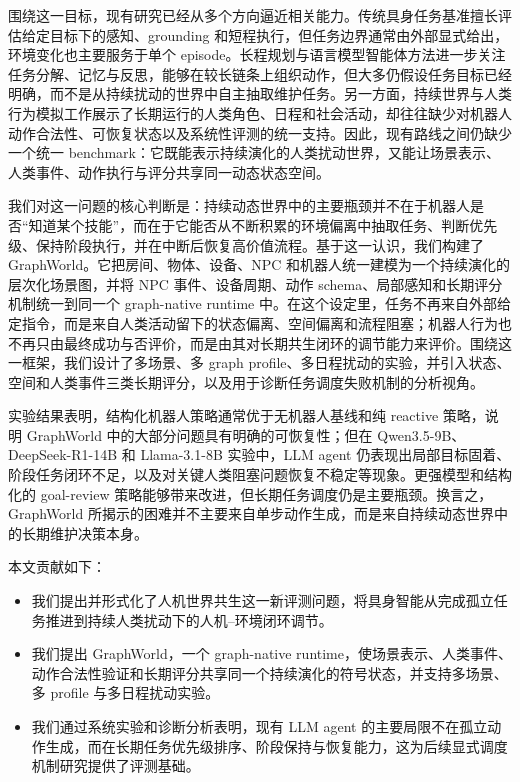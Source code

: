 \documentclass[journal]{IEEEtran}
\begin{document}
围绕这一目标，现有研究已经从多个方向逼近相关能力。传统具身任务基准擅长评估给定目标下的感知、grounding 和短程执行，但任务边界通常由外部显式给出，环境变化也主要服务于单个 episode。长程规划与语言模型智能体方法进一步关注任务分解、记忆与反思，能够在较长链条上组织动作，但大多仍假设任务目标已经明确，而不是从持续扰动的世界中自主抽取维护任务。另一方面，持续世界与人类行为模拟工作展示了长期运行的人类角色、日程和社会活动，却往往缺少对机器人动作合法性、可恢复状态以及系统性评测的统一支持。因此，现有路线之间仍缺少一个统一 benchmark：它既能表示持续演化的人类扰动世界，又能让场景表示、人类事件、动作执行与评分共享同一动态状态空间。

我们对这一问题的核心判断是：持续动态世界中的主要瓶颈并不在于机器人是否“知道某个技能”，而在于它能否从不断积累的环境偏离中抽取任务、判断优先级、保持阶段执行，并在中断后恢复高价值流程。基于这一认识，我们构建了 GraphWorld。它把房间、物体、设备、NPC 和机器人统一建模为一个持续演化的层次化场景图，并将 NPC 事件、设备周期、动作 schema、局部感知和长期评分机制统一到同一个 graph-native runtime 中。在这个设定里，任务不再来自外部给定指令，而是来自人类活动留下的状态偏离、空间偏离和流程阻塞；机器人行为也不再只由最终成功与否评价，而是由其对长期共生闭环的调节能力来评价。围绕这一框架，我们设计了多场景、多 graph profile、多日程扰动的实验，并引入状态、空间和人类事件三类长期评分，以及用于诊断任务调度失败机制的分析视角。

实验结果表明，结构化机器人策略通常优于无机器人基线和纯 reactive 策略，说明 GraphWorld 中的大部分问题具有明确的可恢复性；但在 Qwen3.5-9B、DeepSeek-R1-14B 和 Llama-3.1-8B 实验中，LLM agent 仍表现出局部目标固着、阶段任务闭环不足，以及对关键人类阻塞问题恢复不稳定等现象。更强模型和结构化的 goal-review 策略能够带来改进，但长期任务调度仍是主要瓶颈。换言之，GraphWorld 所揭示的困难并不主要来自单步动作生成，而是来自持续动态世界中的长期维护决策本身。

本文贡献如下：
\begin{itemize}
  \item 我们提出并形式化了人机世界共生这一新评测问题，将具身智能从完成孤立任务推进到持续人类扰动下的人机--环境闭环调节。
  \item 我们提出 GraphWorld，一个 graph-native runtime，使场景表示、人类事件、动作合法性验证和长期评分共享同一个持续演化的符号状态，并支持多场景、多 profile 与多日程扰动实验。
  \item 我们通过系统实验和诊断分析表明，现有 LLM agent 的主要局限不在孤立动作生成，而在长期任务优先级排序、阶段保持与恢复能力，这为后续显式调度机制研究提供了评测基础。
\end{itemize}
\end{document}
